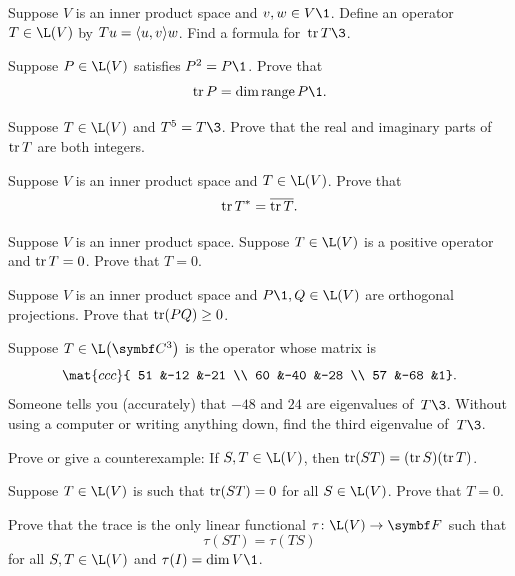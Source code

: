 \begin{exercises}

\exercise
Suppose $V$ is an inner product space and $v, w \in V\1$.  Define an operator
$T \in \L(V)$ by $Tu = \langle u, v\rangle w$.  Find a formula for~$\tr T\3$.


\exercise
Suppose $P \in \L(V)$ satisfies $P^2 = P\1$. Prove that
\[
\tr P = \dim \ran P\1.
\]
\exercisedisplayend


\exercise
Suppose $T \in \L(V)$ and $T^5 = T\3$. Prove that the real and imaginary parts of $\operatorname{tr} T$ are both integers.


\exercise
Suppose $V$ is an inner product space and $T \in \L(V)$. Prove that \label{393}
\[
\operatorname{tr} T^* = \overline{\operatorname{tr} T}.
\]
\exercisedisplayend


\exercise
Suppose $V$ is an inner product space.  Suppose $T \in \L(V)$ is a positive
operator and $\operatorname{tr} T = 0$. Prove that $T = 0$. \label{391}


\exercise
Suppose $V$ is an inner product space and $P\1, Q \in \L(V)$ are orthogonal projections. Prove that $\operatorname{tr}(PQ) \ge 0$.


\exercise
Suppose $T \in \L\paren[\big]{\C{3}}$ is the operator whose matrix is
\[
\mat{ccc}{
51 &-12 &-21 \\
60 &-40 &-28 \\
57 &-68 &1}.
\]
Someone tells you (accurately) that $-48$ and $24$ are eigenvalues of~$T\3$.
Without using a computer or writing anything down, find the third eigenvalue
of~$T\3$.


\exercise
Prove or give a counterexample: If $S, T \in \L(V)$, then
$
\operatorname{tr} (ST) = (\operatorname{tr} S) (\operatorname{tr} T)$.


\exercise
Suppose $T \in \L(V)$ is such that $\operatorname{tr}(ST) = 0$ for all $S \in \L(V)$. Prove that $T = 0$.


\exercise
Prove that the trace is the only linear functional $\fun \tau {\L(V)} {\F{}}$ such that\label{9trChar}
\[
\tau(ST) = \tau(TS)\]
for all $S, T \in \L(V)$ and $\tau(I) = \dim V\1$.



\end{exercises}

